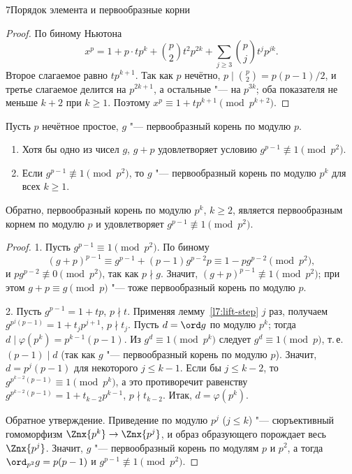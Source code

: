 \begin{lecture}{7}{Порядок элемента и первообразные корни}
\begin{proof}
По биному Ньютона
\[
  x^p = 1 + p \cdot t p^k + \binom p2 t^2 p^{2k} + \sum_{j \ge 3} \binom pj t^j p^{jk}.
\]
Второе слагаемое равно $t p^{k+1}$. Так как $p$ нечётно, $p \mid \binom p2 = p(p-1)/2$, и третье
слагаемое делится на $p^{2k+1}$, а остальные "--- на $p^{3k}$; оба показателя не меньше $k + 2$
при $k \ge 1$. Поэтому $x^p \equiv 1 + t p^{k+1} \pmod{p^{k+2}}$.
\end{proof}

\begin{theorem}\label{l7:pk}
Пусть $p$ нечётное простое, $g$ "--- первообразный корень по модулю $p$.
\begin{enumerate}
  \item Хотя бы одно из чисел $g$, $g + p$ удовлетворяет условию
    $g^{p-1} \not\equiv 1 \pmod{p^2}$.
  \item Если $g^{p-1} \not\equiv 1 \pmod{p^2}$, то $g$ "--- первообразный корень по модулю
    $p^k$ для всех $k \ge 1$.
\end{enumerate}
Обратно, первообразный корень по модулю $p^k$, $k \ge 2$, является первообразным корнем по
модулю $p$ и удовлетворяет $g^{p-1} \not\equiv 1 \pmod{p^2}$.
\end{theorem}

\begin{proof}
1. Пусть $g^{p-1} \equiv 1 \pmod{p^2}$. По биному
\[
  (g + p)^{p-1} \equiv g^{p-1} + (p - 1) g^{p-2} p \equiv 1 - p g^{p-2} \pmod{p^2},
\]
и $p g^{p-2} \not\equiv 0 \pmod{p^2}$, так как $p \nmid g$. Значит, $(g + p)^{p-1}
\not\equiv 1 \pmod{p^2}$; при этом $g + p \equiv g \pmod p$ "--- тоже первообразный корень
по модулю $p$.

2. Пусть $g^{p-1} = 1 + tp$, $p \nmid t$. Применяя лемму~\ref{l7:lift-step} $j$ раз, получаем
$g^{p^j(p-1)} = 1 + t_j p^{j+1}$, $p \nmid t_j$. Пусть $d = \ord g$ по модулю $p^k$; тогда
$d \mid \varphi(p^k) = p^{k-1}(p - 1)$. Из $g^d \equiv 1 \pmod{p^k}$ следует
$g^d \equiv 1 \pmod p$, т.\,е. $(p - 1) \mid d$ (так как $g$ "--- первообразный корень по
модулю $p$). Значит, $d = p^j (p - 1)$ для некоторого $j \le k - 1$. Если бы $j \le k - 2$, то
$g^{p^{k-2}(p-1)} \equiv 1 \pmod{p^k}$, а это противоречит равенству
$g^{p^{k-2}(p-1)} = 1 + t_{k-2} p^{k-1}$, $p \nmid t_{k-2}$. Итак, $d = \varphi(p^k)$.

Обратное утверждение. Приведение по модулю $p^j$ ($j \le k$) "--- сюръективный гомоморфизм
$\Znx{p^k} \to \Znx{p^j}$, и образ образующего порождает весь $\Znx{p^j}$. Значит, $g$ "---
первообразный корень по модулям $p$ и $p^2$, а тогда $\ord_{p^2} g = p(p - 1)$ и
$g^{p-1} \not\equiv 1 \pmod{p^2}$.
\end{proof}


\end{lecture}
